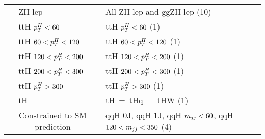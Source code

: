 \begin{tabular}{cll}
   & ZH lep & All ZH lep and ggZH lep (10) \\  [\cmsTabSkip]
   & ttH $p_T^H<60$ & ttH $p_T^H<60$ (1) \\ 
   & ttH $60<p_T^H<120$ & ttH $60<p_T^H<120$ (1) \\ 
   & ttH $120<p_T^H<200$ & ttH $120<p_T^H<200$ (1) \\ 
   & ttH $200<p_T^H<300$ & ttH $200<p_T^H<300$ (1) \\ 
   & ttH $p_T^H>300$ & ttH $p_T^H>300$ (1) \\  [\cmsTabSkip]
   & tH & tH~=~tHq~+~tHW (1) \\
  \hline
  \multicolumn{2}{c}{\rule{0pt}{4ex} Constrained to SM prediction} & qqH 0J, qqH 1J, qqH $m_{jj}<60$, qqH $120<m_{jj}<350$ (4) \\
\end{tabular}

